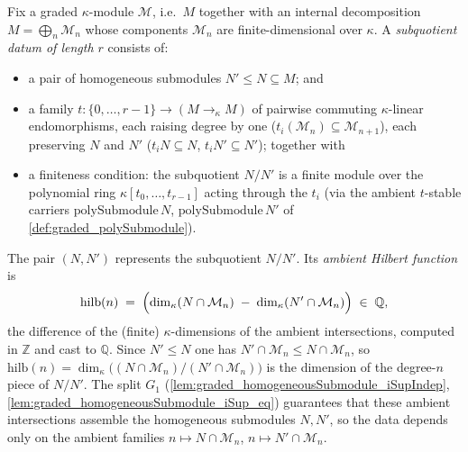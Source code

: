 \begin{definition}
  \label{def:graded_subquotientHilb}
  Fix a graded \(\kappa\)-module \(\mathcal{M}\), i.e.\ \(M\) together with an
  internal decomposition \(M = \bigoplus_n \mathcal{M}_n\) whose components
  \(\mathcal{M}_n\) are finite-dimensional over \(\kappa\). A \emph{subquotient
  datum of length \(r\)} consists of:
  \begin{itemize}
    \item a pair of homogeneous submodules \(N' \le N \subseteq M\); and
    \item a family \(t : \{0, \dots, r-1\} \to (M \to_\kappa M)\) of pairwise
      commuting \(\kappa\)-linear endomorphisms, each raising degree by one
      (\(t_i(\mathcal{M}_n) \subseteq \mathcal{M}_{n+1}\)), each preserving \(N\)
      and \(N'\) (\(t_i N \subseteq N\), \(t_i N' \subseteq N'\)); together with
    \item a finiteness condition: the subquotient \(N/N'\) is a finite module over the
      polynomial ring \(\kappa[t_0, \dots, t_{r-1}]\) acting through the \(t_i\) (via the
      ambient \(t\)-stable carriers \(\mathrm{polySubmodule}\,N\),
      \(\mathrm{polySubmodule}\,N'\) of \cref{def:graded_polySubmodule}).
  \end{itemize}
  The pair \((N, N')\) represents the subquotient \(N/N'\). Its \emph{ambient
  Hilbert function} is
  \[
    \mathrm{hilb}(n) \;=\; \Bigl(\dim_\kappa (N \cap \mathcal{M}_n)
      \;-\; \dim_\kappa (N' \cap \mathcal{M}_n)\Bigr) \;\in\; \mathbb{Q},
  \]
  the difference of the (finite) \(\kappa\)-dimensions of the ambient intersections,
  computed in \(\mathbb{Z}\) and cast to \(\mathbb{Q}\). Since \(N' \le N\) one has
  \(N' \cap \mathcal{M}_n \le N \cap \mathcal{M}_n\), so
  \(\mathrm{hilb}(n) = \dim_\kappa\bigl((N \cap \mathcal{M}_n)/(N' \cap \mathcal{M}_n)\bigr)\)
  is the dimension of the degree-\(n\) piece of \(N/N'\). The split \(G_1\)
  (\cref{lem:graded_homogeneousSubmodule_iSupIndep},
  \cref{lem:graded_homogeneousSubmodule_iSup_eq}) guarantees that these ambient
  intersections assemble the homogeneous submodules \(N, N'\), so the data depends
  only on the ambient families \(n \mapsto N \cap \mathcal{M}_n\),
  \(n \mapsto N' \cap \mathcal{M}_n\).
\end{definition}

